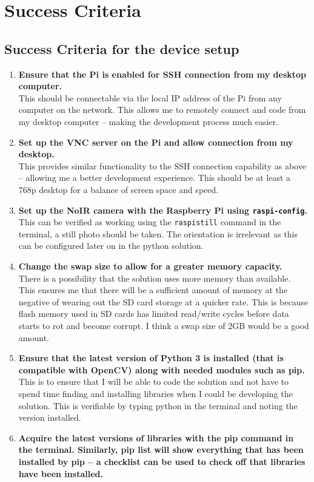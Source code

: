 \documentclass[9pt]{article}
\begin{document}
\newpage
\section{Success Criteria}\label{sec_succes}

\begin{small}
	\subsection{Success Criteria for the device setup}\label{sec_device}
	\begin{enumerate}
	\setlength{\itemsep}{4pt}
	\setlength{\parskip}{0pt}
	\item \textbf{Ensure that the Pi is enabled for SSH connection from my desktop computer.}\\
		This should be connectable via the local IP address of the Pi from any computer on the network. This allows me to remotely connect and code from my desktop computer – making the development process much easier.
	\item \textbf{Set up the VNC server on the Pi and allow connection from my desktop.}\\
		This provides similar functionality to the SSH connection capability as above – allowing me a better development experience. This should be at least a 768p desktop for a balance of screen space and speed.
	\item \textbf{Set up the NoIR camera with the Raspberry Pi using \texttt{raspi-config}.}\\
		This can be verified as working using the \texttt{raspistill} command in the terminal, a still photo should be taken. The orientation is irrelevant as this can be configured later on in the python solution.
	\item \textbf{Change the swap size to allow for a greater memory capacity.}\\
		There is a possibility that the solution uses more memory than available. This ensures me that there will be a sufficient amount of memory at the negative of wearing out the SD card storage at a quicker rate. This is because flash memory used in SD cards has limited read/write cycles before data starts to rot and become corrupt. I think a swap size of 2GB would be a good amount.
	\item \textbf{Ensure that the latest version of Python 3 is installed (that is compatible with OpenCV) along with needed modules such as pip.}\\
		This is to ensure that I will be able to code the solution and not have to spend time finding and installing libraries when I could be developing the solution. This is verifiable by typing python in the terminal and noting the version installed. 
	\item \textbf{Acquire the latest versions of libraries with the pip command in the terminal. Similarly, pip list will show everything that has been installed by pip – a checklist can be used to check off that libraries have been installed.}
	\end{enumerate}
\end{small}
\end{document}
